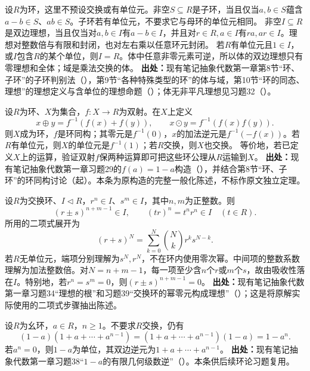 \begin{reviewprop}\label{tool:g-ring-criteria}
设$R$为环，这里不预设交换或有单位元。非空$S\subseteq R$是子环，当且仅当$a,b\in S$蕴含$a-b\in S$、$ab\in S$。子环若有单位元，不要求它与母环的单位元相同。
非空$I\subseteq R$是双边理想，当且仅当对$a,b\in I$有$a-b\in I$，并且对$r\in R,a\in I$有$ra,ar\in I$。理想对整数倍与有限和封闭，也对左右乘以任意环元封闭。
若$R$有单位元且$1\in I$，或$I$包含$R$的某个单位，则$I=R$。体中任意非零元素可逆，所以体的双边理想只有零理想和全体；域是乘法交换的体。
\textbf{出处：}现有笔记抽象代数第一章第8节“环、子环”的子环判别法（），第9节“各种特殊类型的环”的体与域，第10节“环的同态、理想”的理想定义与含单位的理想命题（）；体无非平凡理想见习题32（）。
\end{reviewprop}

\begin{reviewprop}[由双射运输环运算]\label{tool:g-transport}
设$R$为环、$X$为集合，$f:X\to R$为双射。在$X$上定义
\[
x\oplus y=f^{-1}(f(x)+f(y)),\qquad
x\odot y=f^{-1}(f(x)f(y)).
\]
则$X$成为环，$f$是环同构；其零元是$f^{-1}(0)$，$x$的加法逆元是$f^{-1}(-f(x))$。若$R$有单位元，则$X$的单位元是$f^{-1}(1)$；若$R$交换，则$X$也交换。
等价地，若已定义$X$上的运算，验证双射$f$保两种运算即可把这些环公理从$R$运输到$X$。
\textbf{出处：}现有笔记抽象代数第一章习题29的$f(a)=1-a$构造（），并结合第8节“环、子环”的环同构讨论（起）。本条为原构造的完整一般化陈述，不标作原文独立定理。
\end{reviewprop}

\begin{reviewlemma}[交换环二项式展开与理想中的幂]\label{tool:g-binomial}
设$R$为交换环、$I\lhd R$，$r^n\in I$、$s^m\in I$，其中$n,m$为正整数。则
\[
(r\pm s)^{n+m-1}\in I,\qquad
(tr)^n=t^nr^n\in I\quad(t\in R).
\]
所用的二项式展开为
\[
(r+s)^N=\sum_{k=0}^{N}\binom Nk r^ks^{N-k}.
\]
若$R$无单位元，端项分别理解为$s^N,r^N$，不在环内使用零次幂。中间项的整数系数理解为加法整数倍。对$N=n+m-1$，每一项至少含$n$个$r$或$m$个$s$，故由吸收性落在$I$。特别地，若$r^n=s^m=0$，则$(r\pm s)^{n+m-1}=0$。
\textbf{出处：}现有笔记抽象代数第一章习题34“理想的根”和习题39“交换环的幂零元构成理想”（）；这是将原解实际使用的二项式步骤抽出陈述。
\end{reviewlemma}

\begin{reviewlemma}[同一元素的有限几何级数]\label{tool:g-geometric}
设$R$为幺环，$a\in R$，$n\geq1$。不要求$R$交换，仍有
\[
(1-a)(1+a+\cdots+a^{n-1})
=(1+a+\cdots+a^{n-1})(1-a)=1-a^n.
\]
若$a^n=0$，则$1-a$为单位，其双边逆元为$1+a+\cdots+a^{n-1}$。
\textbf{出处：}现有笔记抽象代数第一章习题38“$1-a$的有限几何级数逆”（）。本条供后续环论习题复用。
\end{reviewlemma}


